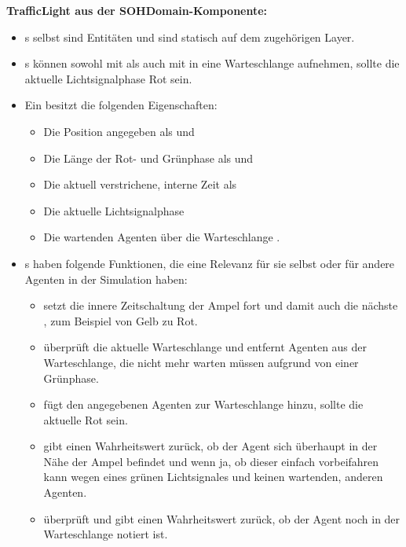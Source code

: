 \textbf{TrafficLight aus der SOHDomain-Komponente:}
\begin{itemize}
    \item {}s selbst sind Entitäten und sind statisch auf dem zugehörigen Layer.
    \item {}s können sowohl mit  als auch mit  in eine Warteschlange aufnehmen, sollte die aktuelle Lichtsignalphase Rot sein.
    \item Ein  besitzt die folgenden Eigenschaften:
    \begin{itemize}
        \item Die Position angegeben als  und 
        \item Die Länge der Rot- und Grünphase als  und 
        \item Die aktuell verstrichene, interne Zeit als 
        \item Die aktuelle Lichtsignalphase 
        \item Die wartenden Agenten über die Warteschlange .
    \end{itemize}
    \item {}s haben folgende Funktionen, die eine Relevanz für sie selbst oder für andere Agenten in der Simulation haben:
    \begin{itemize}
        \item {} setzt die innere Zeitschaltung der Ampel fort und damit auch die nächste , zum Beispiel von Gelb zu Rot.
        \item {} überprüft die aktuelle Warteschlange und entfernt Agenten aus der Warteschlange, die nicht mehr warten müssen aufgrund von einer Grünphase.
        \item {} fügt den angegebenen Agenten zur Warteschlange hinzu, sollte die aktuelle  Rot sein.
        \item {} gibt einen Wahrheitswert zurück, ob der Agent sich überhaupt in der Nähe der Ampel befindet und wenn ja, ob dieser einfach vorbeifahren kann wegen eines grünen Lichtsignales und keinen wartenden, anderen Agenten.
        \item {} überprüft und gibt einen Wahrheitswert zurück, ob der Agent noch in der Warteschlange notiert ist.
    \end{itemize}
\end{itemize}


